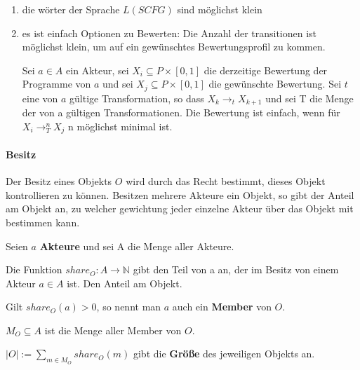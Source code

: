 \documentclass[]{article}
\begin{document}
\begin{enumerate}
  \item die wörter der Sprache $L(SCFG)$ sind möglichst klein
  \item es ist einfach Optionen zu Bewerten: Die Anzahl der transitionen ist möglichst klein, um auf ein gewünschtes Bewertungsprofil zu kommen.
    
    Sei $a\in A$ ein Akteur, sei $X_i\subseteq P\times [0,1]$ die derzeitige Bewertung der Programme von $a$ und sei $X_j\subseteq P\times [0,1]$ die gewünschte Bewertung. Sei $t$ eine von $a$ gültige Transformation, so dass $X_k \rightarrow_{t} X_{k+1}$ und sei T die Menge der von a gültigen Transformationen. Die Bewertung ist einfach, wenn für $X_i \rightarrow_{ T }^n X_j$ n möglichst minimal ist.
\end{enumerate}

\paragraph{Besitz}

Der Besitz eines Objekts $O$ wird durch das Recht bestimmt, dieses Objekt kontrollieren zu können. Besitzen mehrere Akteure ein Objekt, so gibt der Anteil am Objekt an, zu welcher gewichtung jeder einzelne Akteur über das Objekt mit bestimmen kann. 

Seien $a$ \textbf{Akteure} und sei A die Menge aller Akteure.

Die Funktion $share_O: A \rightarrow \mathbb{N}$ gibt den Teil von a an, der im Besitz von einem Akteur $a\in A$ ist. Den Anteil am Objekt.

Gilt $share_O(a) > 0$, so nennt man $a$ auch ein \textbf{Member} von $O$.

$M_O \subseteq A$ ist die Menge aller Member von $O$.

$|O| := \sum_{m\in M_O} share_O(m)$ gibt die \textbf{Größe} des jeweiligen Objekts an.
\end{document}
